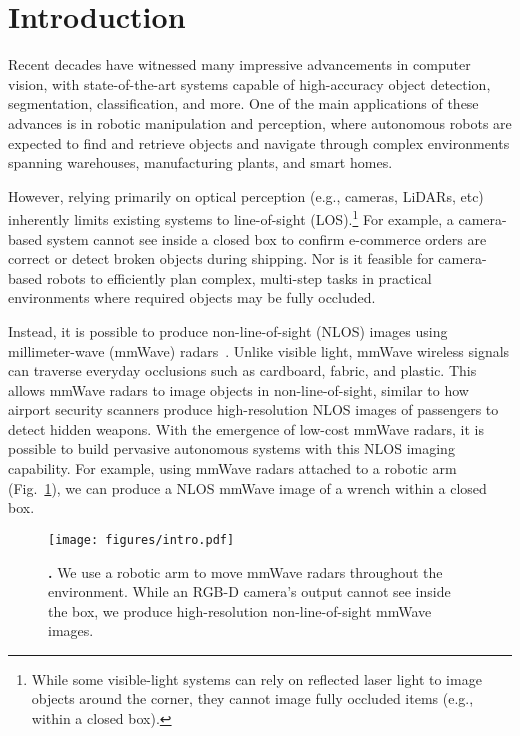 \vspace{-0.1in}
\section{Introduction}
\vspace{-0.1pt}


Recent decades have witnessed many impressive advancements in computer vision, with state-of-the-art systems capable of high-accuracy object detection, segmentation, classification, and more. One of the main applications of these advances is in robotic manipulation and perception, where autonomous robots are expected to find and retrieve objects and navigate through complex environments spanning warehouses, manufacturing plants, and smart homes.


However, relying primarily on optical perception (e.g., cameras, LiDARs, etc) inherently limits existing systems to line-of-sight (LOS).\footnote{While some visible-light systems can rely on reflected laser light to image objects around the corner, they cannot image fully occluded items (e.g., within a closed box).} For example, a camera-based system cannot see inside a closed box to confirm e-commerce orders are correct or detect broken objects during shipping. Nor is it feasible for camera-based robots to efficiently plan complex, multi-step tasks in practical environments where required objects may be fully occluded. 

Instead, it is possible to produce non-line-of-sight (NLOS) images using millimeter-wave (mmWave) radars~\cite{ti_iwr1443}. Unlike visible light, mmWave wireless signals can traverse everyday occlusions such as cardboard, fabric, and plastic. This allows mmWave radars to image objects in non-line-of-sight, similar to how airport security scanners produce high-resolution NLOS images of passengers to detect hidden weapons. With the emergence of low-cost mmWave radars, it is possible to build pervasive autonomous systems with this NLOS imaging capability. For example, using mmWave radars attached to a robotic arm (Fig.~\ref{fig:intro}), we can produce a NLOS mmWave image of a wrench within a closed box.



\begin{figure}
\centering
    \texttt{[image: figures/intro.pdf]}
    \caption{\footnotesize{\textbf{\name.}} \textnormal{We use a robotic arm to move mmWave radars throughout the environment. While an RGB-D camera's output cannot see inside the box, we produce high-resolution non-line-of-sight mmWave images. } }
    \label{fig:intro}
    \vspace{-0.2in}
\end{figure}


